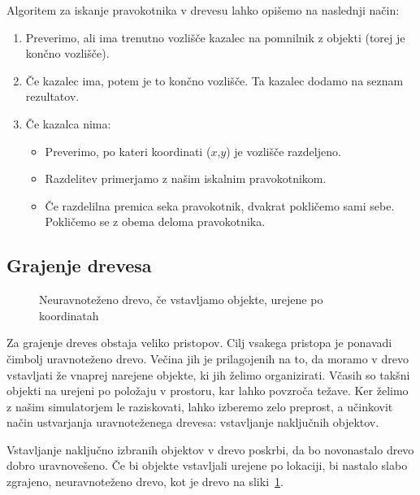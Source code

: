 \documentclass[a4paper,12pt]{article}
\begin{document}
Algoritem za iskanje pravokotnika v drevesu lahko opišemo na naslednji način:
\begin{samepage}
    \begin{enumerate}
        \item Preverimo, ali ima trenutno vozlišče kazalec na pomnilnik z objekti (torej je končno vozlišče).
        \item Če kazalec ima, potem je to končno vozlišče. Ta kazalec dodamo na seznam rezultatov.
        \item Če kazalca nima:
        \begin{itemize}
            \item Preverimo, po kateri koordinati ($x$,$y$) je vozlišče razdeljeno.
            \item Razdelitev primerjamo z našim iskalnim pravokotnikom.
            \item Če razdelilna premica seka pravokotnik, dvakrat pokličemo sami sebe.
            Pokličemo se z obema deloma pravokotnika.
        \end{itemize}
    \end{enumerate}
\end{samepage}

\newpage
\subsection{Grajenje drevesa}

\begin{figure}
    \centering
    
    \caption{Neuravnoteženo drevo, če vstavljamo objekte, urejene po koordinatah}%
    \label{fig:drevo_unbal}
\end{figure}

Za grajenje dreves obstaja veliko pristopov. Cilj vsakega pristopa je ponavadi čimbolj
uravnoteženo drevo. Večina jih je prilagojenih na to, da moramo v drevo vstavljati že vnaprej
narejene objekte, ki jih želimo organizirati. Včasih so takšni objekti na urejeni po položaju v prostoru,
kar lahko povzroča težave. Ker želimo z našim simulatorjem le raziskovati, lahko izberemo zelo 
preprost, a učinkovit način ustvarjanja uravnoteženega drevesa: vstavljanje naključnih objektov.

Vstavljanje naključno izbranih objektov v drevo poskrbi, da bo novonastalo drevo dobro uravnovešeno.
Če bi objekte vstavljali urejene po lokaciji, bi nastalo slabo zgrajeno, neuravnoteženo drevo, kot je
drevo na sliki~\ref{fig:drevo_unbal}.
\end{document}

